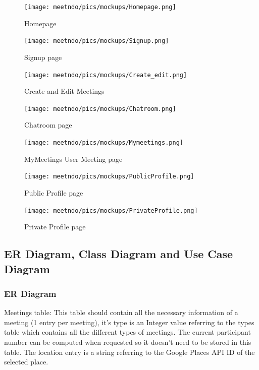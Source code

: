 \documentclass[conference]{IEEEtran}
\begin{document}
\begin{figure}
  \centering
  \texttt{[image: meetndo/pics/mockups/Homepage.png]}\quad
  \caption { Homepage}
\end{figure}

\begin{figure}
  \centering
  \texttt{[image: meetndo/pics/mockups/Signup.png]}\quad
  \caption { Signup page}
\end{figure}

\begin{figure}
  \centering
  \texttt{[image: meetndo/pics/mockups/Create\_edit.png]}\quad
  \caption { Create and Edit Meetings}
\end{figure}

\begin{figure}
  \centering
  \texttt{[image: meetndo/pics/mockups/Chatroom.png]}\quad
  \caption { Chatroom page}
\end{figure}

\begin{figure}
  \centering
  \texttt{[image: meetndo/pics/mockups/Mymeetings.png]}\quad
  \caption { MyMeetings User Meeting page}
\end{figure}

\begin{figure}
  \centering
  \texttt{[image: meetndo/pics/mockups/PublicProfile.png]}\quad
  \caption { Public Profile page}
\end{figure}

\begin{figure}
  \centering
  \texttt{[image: meetndo/pics/mockups/PrivateProfile.png]}\quad
  \caption { Private Profile page}
\end{figure}

\clearpage

\subsection{ER Diagram, Class Diagram and Use Case Diagram}

\subsubsection{ER Diagram}

Meetings table: 
This table should contain all the necessary information of a meeting (1 entry per meeting), it’s type is an Integer value referring to the types table which contains all the different types of meetings. The current participant number can be computed when requested so it doesn’t need to be stored in this table. The location entry is a string referring to the Google Places API ID of the selected place.
\end{document}
